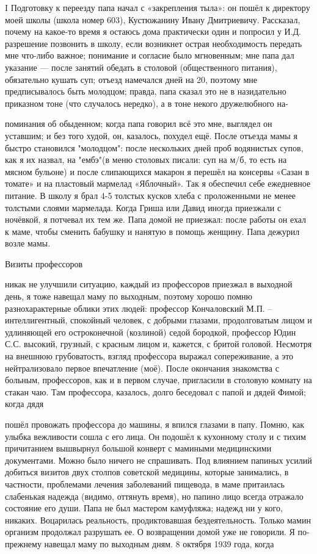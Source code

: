 
\label{187-1}
I Подготовку к переезду папа начал с «закрепления тыла»: он пошёл к директору моей школы (школа номер 603), Кустюжанину Ивану Дмитриевичу. Рассказал, почему на какое-то время я остаюсь дома практически один и попросил у И.Д. разрешение позвонить в школу, если возникнет острая необходимость передать мне что-либо важное; понимание и согласие было мгновенным; мне папа дал указание — после занятий обедать в столовой (общественного питания), обязательно кушать суп; отъезд намечался дней на 20, поэтому мне предписывалось быть молодцом; правда, папа сказал это не в назидательно приказном тоне (что случалось нередко), а в тоне некого дружелюбного на-

\label{188-1}
поминания об обыденном; когда папа говорил всё это мне, выглядел он уставшим; и без того худой, он, казалось, похудел ещё. После отъезда мамы я быстро становился "молодцом": после нескольких дней проб водянистых супов, как я их назвал, на "ембэ"(в меню столовых писали: суп на м/б, то есть на мясном бульоне) и после слипающихся макарон я перешёл на консервы «Сазан в томате» и на пластовый мармелад «Яблочный». Так я обеспечил себе ежедневное питание. В школу я брал 4-5 толстых кусков хлеба с проложенными не менее толстыми слоями мармелада. Когда Гриша или Давид иногда приезжали с ночёвкой, я потчевал их тем же. Папа домой не приезжал: после работы он ехал к маме, чтобы сменить бабушку и нанятую в помощь женщину. Папа дежурил возле мамы.

Визиты профессоров

\label{189-1}
никак не улучшили ситуацию, каждый из профессоров приезжал в выходной день, я тоже навещал маму по выходным, поэтому хорошо помню разнохарактерные облики этих людей: профессор Кончаловский М.П. – интеллигентный, спокойный человек, с добрыми глазами, продолговатым лицом и удлиняющей его остроконечной (козлиной) седой бородкой, профессор Юдин С.С. высокий, грузный, с красным лицом и, кажется, с бритой головой. Несмотря на внешнюю грубоватость, взгляд профессора выражал сопереживание, а это нейтрализовало первое впечатление (моё). После окончания знакомства с больным, профессоров, как и в первом случае, пригласили в столовую комнату на стакан чаю. Там профессора, казалось, долго беседовал с папой и дядей Фимой; когда дядя

\label{190-1}
пошёл провожать профессора до машины, я впился глазами в папу. Помню, как улыбка вежливости сошла с его лица. Он подошёл к кухонному столу и с тихим причитанием вышвырнул большой конверт с мамиными медицинскими документами. Можно было ничего не спрашивать. Под влиянием папиных усилий добиться визитов двух столпов советской медицины, которые занимались, в частности, проблемами лечения заболеваний пищевода, в маме притаилась слабенькая надежда (видимо, оттянуть время), но папино лицо всегда отражало состояние его души. Папа не был мастером камуфляжа; надежд ни у кого, никаких. Воцарилась реальность, продиктовавшая бездеятельность. Только мамин организм продолжал разрушать ее. О возвращении домой уже не говорили. Я по-прежнему навещал маму по выходным дням. 8 октября 1939 года, когда 


